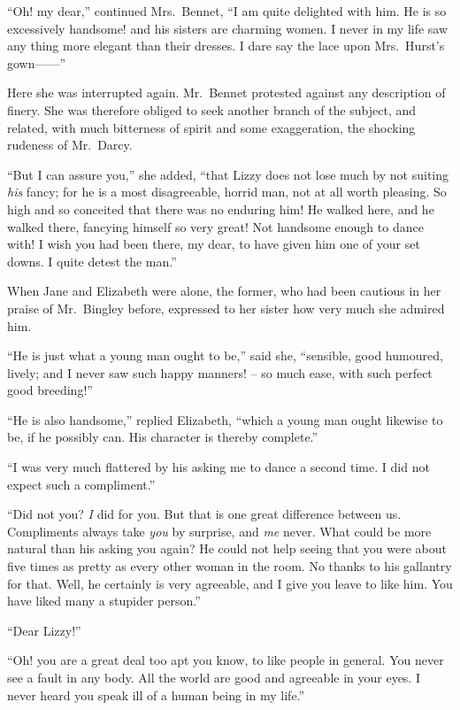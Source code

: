 “Oh! my dear,” continued Mrs.\ Bennet, “I am quite
delighted with him. He is so excessively handsome! and
his sisters are charming women. I never in my life saw
any thing more elegant than their dresses. I dare say the
lace upon Mrs.\ Hurst’s gown------”

Here she was interrupted again. Mr.\ Bennet protested
against any description of finery. She was therefore
obliged to seek another branch of the subject, and related,
with much bitterness of spirit and some exaggeration, the
shocking rudeness of Mr.\ Darcy.

“But I can assure you,” she added, “that Lizzy does
not lose much by not suiting \textit{his} fancy; for he is a most
disagreeable, horrid man, not at all worth pleasing. So
high and so conceited that there was no enduring him!
He walked here, and he walked there, fancying himself
so very great! Not handsome enough to dance with!
I wish you had been there, my dear, to have given him
one of your set downs. I quite detest the man.”


When Jane and Elizabeth were alone, the former, who
had been cautious in her praise of Mr.\ Bingley before,
expressed to her sister how very much she admired him.

“He is just what a young man ought to be,” said she,
“sensible, good humoured, lively; and I never saw such
happy manners! -- so much ease, with such perfect good
breeding!”

“He is also handsome,” replied Elizabeth, “which
a young man ought likewise to be, if he possibly can.
His character is thereby complete.”

“I was very much flattered by his asking me to dance
a second time. I did not expect such a compliment.”

“Did not you? \textit{I} did for you. But that is one great
difference between us. Compliments always take \textit{you} by
surprise, and \textit{me} never. What could be more natural than
his asking you again? He could not help seeing that you
were about five times as pretty as every other woman in
the room. No thanks to his gallantry for that. Well,
he certainly is very agreeable, and I give you leave to
like him. You have liked many a stupider person.”

“Dear Lizzy!”

“Oh! you are a great deal too apt you know, to like
people in general. You never see a fault in any body.
All the world are good and agreeable in your eyes. I never
heard you speak ill of a human being in my life.”

